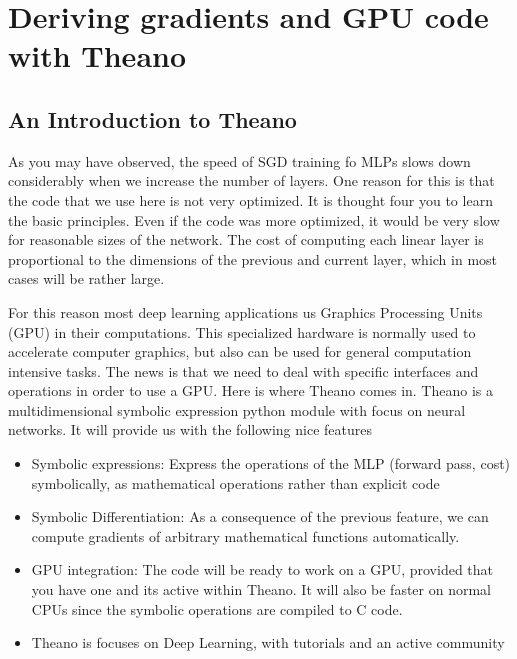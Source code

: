 \section{Deriving gradients and GPU code with Theano}

\subsection{An Introduction to Theano}

As you may have observed, the speed of SGD training fo MLPs slows down
considerably when we increase the number of layers. One reason for this is that
the code that we use here is not very optimized. It is thought four you to
learn the basic principles. Even if the code was more optimized, it would be
very slow for reasonable sizes of the network. The cost of computing each
linear layer is proportional to the dimensions of the previous and current
layer, which in most cases will be rather large. 

For this reason most deep learning applications us Graphics Processing Units
(GPU) in their computations. This specialized hardware is normally used to
accelerate computer graphics, but also can be used for general computation
intensive tasks. The news is that we need to deal with specific interfaces and
operations in order to use a GPU. Here is where Theano comes in. Theano is a
multidimensional symbolic expression python module with focus on neural
networks. It will provide us with the following nice features

\begin{itemize}
\item Symbolic expressions: Express the operations of the MLP (forward pass, cost) symbolically, as mathematical operations rather than explicit code 
\item Symbolic Differentiation: As a consequence of the previous feature, we can compute gradients of arbitrary mathematical functions automatically.   
\item GPU integration: The code will be ready to work on a GPU, provided that you have one and its active within Theano. It will also be faster on normal CPUs since the symbolic operations are compiled to C code. 
\item Theano is focuses on Deep Learning, with tutorials and an active community   
\end{itemize}

